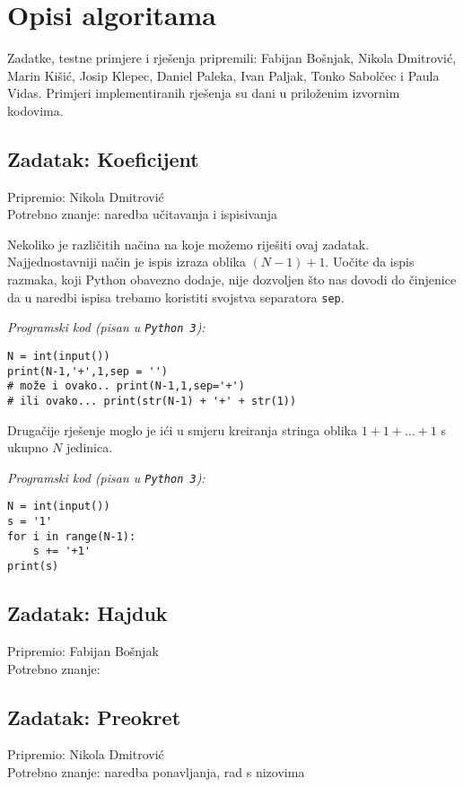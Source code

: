 \documentclass[a4paper]{article}
\begin{document}
\section*{Opisi algoritama}
Zadatke, testne primjere i rješenja pripremili: Fabijan Bošnjak, Nikola
Dmitrović, Marin Kišić, Josip Klepec, Daniel Paleka, Ivan Paljak, Tonko
Sabolčec i Paula Vidas. Primjeri implementiranih rješenja su dani u priloženim
izvornim kodovima.

\subsection*{Zadatak: Koeficijent}
\textsf{Pripremio: Nikola Dmitrović}\\
\textsf{Potrebno znanje: naredba učitavanja i ispisivanja}

Nekoliko je različitih načina na koje možemo riješiti ovaj zadatak.
Najjednostavniji način je ispis izraza oblika $(N-1)+1$. Uočite da ispis
razmaka, koji Python obavezno dodaje, nije dozvoljen što nas dovodi do
činjenice da u naredbi ispisa trebamo koristiti svojstva separatora
\texttt{sep}.

\textit{Programski kod (pisan u \texttt{Python 3}):}

\vspace{-2ex}
\begin{verbatim}
N = int(input())
print(N-1,'+',1,sep = '')
# može i ovako.. print(N-1,1,sep='+')
# ili ovako... print(str(N-1) + '+' + str(1))
\end{verbatim}

Drugačije rješenje moglo je ići u smjeru kreiranja stringa oblika $1+1+\dots+1$
s ukupno $N$ jedinica.

\textit{Programski kod (pisan u \texttt{Python 3}):}

\vspace{-2ex}
\begin{verbatim}
N = int(input())
s = '1'
for i in range(N-1):
    s += '+1'
print(s)
\end{verbatim}

\subsection*{Zadatak: Hajduk}
\textsf{Pripremio: Fabijan Bošnjak}\\
\textsf{Potrebno znanje: }

\subsection*{Zadatak: Preokret}
\textsf{Pripremio: Nikola Dmitrović}\\
\textsf{Potrebno znanje: naredba ponavljanja, rad s nizovima}
\end{document}
